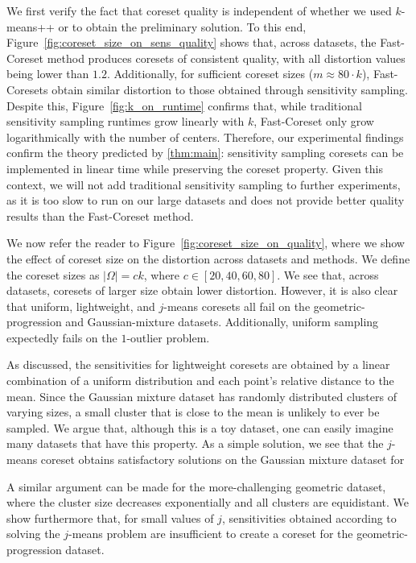 We first verify the fact that coreset quality is independent of whether we used $k$-means++ or \fkmeans to obtain the preliminary solution. To this end,
Figure~\ref{fig:coreset_size_on_sens_quality} shows that, across datasets, the Fast-Coreset method produces coresets of consistent quality, with all distortion
values being lower than $1.2$. Additionally, for sufficient coreset sizes ($m \approx 80\cdot k$), Fast-Coresets obtain similar distortion to those obtained
through sensitivity sampling. Despite this, Figure~\ref{fig:k_on_runtime} confirms that, while traditional sensitivity sampling runtimes grow linearly with $k$,
Fast-Coreset only grow logarithmically with the number of centers.  Therefore, our experimental findings confirm the theory predicted by \cref{thm:main}:
sensitivity sampling coresets can be implemented in linear time while preserving the coreset property. Given this context, we will not add traditional
sensitivity sampling to further experiments, as it is too slow to run on our large datasets and does not provide better quality results than the Fast-Coreset
method.

We now refer the reader to Figure~\ref{fig:coreset_size_on_quality}, where we show the effect of coreset size on the distortion across datasets and methods.  We
define the coreset sizes as $|\Omega| = ck$, where $c \in [20, 40, 60, 80]$. We see that, across datasets, coresets of larger size obtain lower distortion.
However, it is also clear that uniform, lightweight, and $j$-means coresets all fail on the geometric-progression and Gaussian-mixture datasets. Additionally,
uniform sampling expectedly fails on the $1$-outlier problem.

As discussed, the sensitivities for lightweight coresets are obtained by a linear combination of a uniform distribution and each point's relative
distance to the mean. Since the Gaussian mixture dataset has randomly distributed clusters of varying sizes, a small cluster that is close to the mean is unlikely
to ever be sampled. We argue that, although this is a toy dataset, one can easily imagine many datasets that have this property. As a simple solution, we see
that the $j$-means coreset obtains satisfactory solutions on the Gaussian mixture dataset for 

A similar argument can be made for the more-challenging geometric dataset, where the cluster size decreases exponentially and all clusters are equidistant.
We show furthermore that, for small values of $j$, sensitivities obtained according to
solving the $j$-means problem are insufficient to create a coreset for the geometric-progression dataset.

